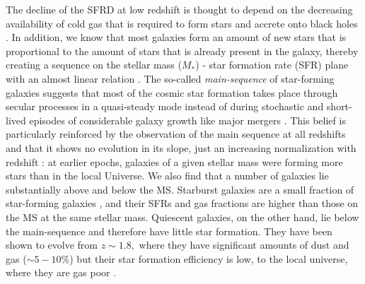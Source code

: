     The decline of the SFRD at low redshift is thought to depend on the decreasing availability of cold gas that is required to form stars and accrete onto black holes \citep[e.g.,][]{2016MNRAS.458L..14F}. In addition, we know that most galaxies form an amount of new stars that is proportional to the amount of stars that is already present in the galaxy, thereby creating a sequence on the stellar mass ($M_*$) - star formation rate (SFR) plane with an almost linear relation%
    . The so-called \emph{\textup{main-sequence}} of star-forming galaxies \citep{2004MNRAS.351.1151B, 2007ApJ...670..156D, 2007A&A...468...33E, 2007ApJ...660L..43N, 2014MNRAS.443...19R, 2017MNRAS.465.3390A} suggests that most of the cosmic star formation takes place through secular %
    processes in a quasi-steady mode instead of during stochastic and short-lived episodes of considerable galaxy growth like major mergers \citep{2011ApJ...739L..40R}. This belief is particularly reinforced by the observation of the main sequence at all redshifts and that it shows no evolution in its slope, just an increasing normalization with redshift \citep{2015A&A...581A..54T, 2015A&A...575A..74S, 2016ApJ...817..118T}: at earlier epochs, galaxies of a given stellar mass were forming more stars than in the local Universe.
    We also find that a number of galaxies lie substantially above and below the MS.
    Starburst galaxies are a small fraction of star-forming galaxies \citep[$\sim2\%$][]{2011ApJ...739L..40R}, and their SFRs and gas fractions are higher than those on the MS at the same stellar mass. 
    Quiescent galaxies, on the other hand, lie below the main-sequence and therefore have little star formation. They have been shown to evolve from $z\sim1.8,$ where they have significant amounts of dust and gas ($\sim5-10\%$) but their star formation efficiency is low, to the local universe, where they are gas poor \citep{2018NatAs...2..239G}.
    
